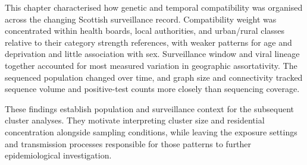 This chapter characterised how genetic and temporal compatibility was organised across the changing Scottish surveillance record. Compatibility weight was concentrated within health boards, local authorities, and urban/rural classes relative to their category strength references, with weaker patterns for age and deprivation and little association with sex. Surveillance window and viral lineage together accounted for most measured variation in geographic assortativity. The sequenced population changed over time, and graph size and connectivity tracked sequence volume and positive-test counts more closely than sequencing coverage.

These findings establish population and surveillance context for the subsequent cluster analyses. They motivate interpreting cluster size and residential concentration alongside sampling conditions, while leaving the exposure settings and transmission processes responsible for those patterns to further epidemiological investigation.
